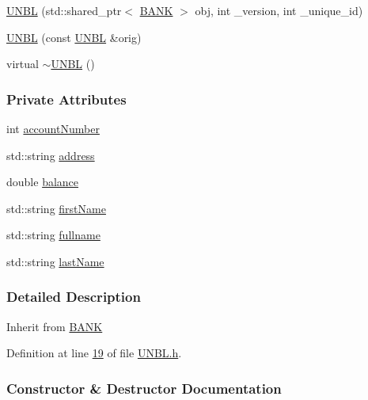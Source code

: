 \begin{DoxyCompactItemize}
\item 
\hyperlink{class_u_n_b_l_abbd578fbd58cf6f2143f17b3011f6c21_abbd578fbd58cf6f2143f17b3011f6c21}{U\+N\+BL} (std\+::shared\+\_\+ptr$<$ \hyperlink{class_b_a_n_k}{B\+A\+NK} $>$ obj, int \+\_\+version, int \+\_\+unique\+\_\+id)
\item 
\hyperlink{class_u_n_b_l_aca7a99d7308d5d8dd5841a0eeeed0852_aca7a99d7308d5d8dd5841a0eeeed0852}{U\+N\+BL} (const \hyperlink{class_u_n_b_l}{U\+N\+BL} \&orig)
\item 
virtual \hyperlink{class_u_n_b_l_a32d405e6e9adfab1ffdeec6406f9e72f_a32d405e6e9adfab1ffdeec6406f9e72f}{$\sim$\+U\+N\+BL} ()
\end{DoxyCompactItemize}
\subsubsection*{Private Attributes}
\begin{DoxyCompactItemize}
\item 
int \hyperlink{class_u_n_b_l_a90763c3044159862bcb9cd51d6b09f34_a90763c3044159862bcb9cd51d6b09f34}{account\+Number}
\item 
std\+::string \hyperlink{class_u_n_b_l_acdaf39211e9b9c190a69bbbc590543e3_acdaf39211e9b9c190a69bbbc590543e3}{address}
\item 
double \hyperlink{class_u_n_b_l_afbe674996d7fddaffb55654e6a79f03b_afbe674996d7fddaffb55654e6a79f03b}{balance}
\item 
std\+::string \hyperlink{class_u_n_b_l_acee1595bf1914ac220f7c810b174bd16_acee1595bf1914ac220f7c810b174bd16}{first\+Name}
\item 
std\+::string \hyperlink{class_u_n_b_l_a67deb62f553fe1ece6feb73f12898e7a_a67deb62f553fe1ece6feb73f12898e7a}{fullname}
\item 
std\+::string \hyperlink{class_u_n_b_l_a3f42790177cbe310536f53a7369ee194_a3f42790177cbe310536f53a7369ee194}{last\+Name}
\end{DoxyCompactItemize}


\subsubsection{Detailed Description}
Inherit from \hyperlink{class_b_a_n_k}{B\+A\+NK} 

Definition at line \hyperlink{_u_n_b_l_8h_source_l00019}{19} of file \hyperlink{_u_n_b_l_8h_source}{U\+N\+B\+L.\+h}.



\subsubsection{Constructor \& Destructor Documentation}

